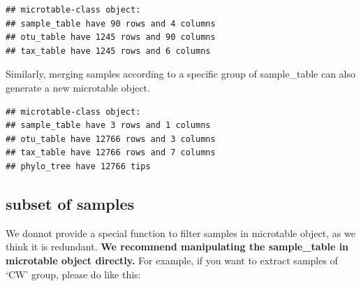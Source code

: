 \documentclass[
]{book}
\newenvironment{Shaded}{\begin{snugshade}}{\end{snugshade}}
\newcommand{\AttributeTok}[1]{\textcolor[rgb]{0.77,0.63,0.00}{#1}}
\newcommand{\FunctionTok}[1]{\textcolor[rgb]{0.00,0.00,0.00}{#1}}
\newcommand{\NormalTok}[1]{#1}
\newcommand{\OtherTok}[1]{\textcolor[rgb]{0.56,0.35,0.01}{#1}}
\newcommand{\SpecialCharTok}[1]{\textcolor[rgb]{0.00,0.00,0.00}{#1}}
\newcommand{\StringTok}[1]{\textcolor[rgb]{0.31,0.60,0.02}{#1}}
\begin{document}
\begin{Shaded}
\end{Shaded}

\begin{verbatim}
## microtable-class object:
## sample_table have 90 rows and 4 columns
## otu_table have 1245 rows and 90 columns
## tax_table have 1245 rows and 6 columns
\end{verbatim}

Similarly, merging samples according to a specific group of sample\_table can also generate a new microtable object.

\begin{Shaded}
\end{Shaded}

\begin{verbatim}
## microtable-class object:
## sample_table have 3 rows and 1 columns
## otu_table have 12766 rows and 3 columns
## tax_table have 12766 rows and 7 columns
## phylo_tree have 12766 tips
\end{verbatim}

\hypertarget{subset-of-samples}{%
\subsection{subset of samples}\label{subset-of-samples}}

We donnot provide a special function to filter samples in microtable object, as we think it is redundant.
\textbf{We recommend manipulating the sample\_table in microtable object directly.}
For example, if you want to extract samples of `CW' group, please do like this:
\end{document}
